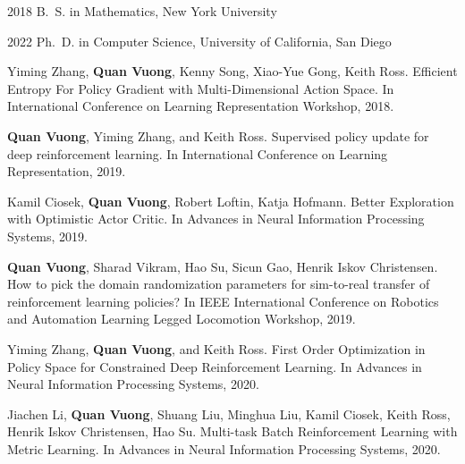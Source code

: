 \begin{frontmatter}
%
%



%
%
\begin{vitapage}
\begin{vita}
  \item[2018] B.~S. in Mathematics, New York University
  \item[2022] Ph.~D. in Computer Science, University of California, San Diego
\end{vita}
\begin{publications}
   \item Yiming Zhang, \textbf{Quan Vuong}, Kenny Song, Xiao-Yue Gong, Keith Ross. Efficient Entropy For Policy Gradient with Multi-Dimensional Action Space. In International Conference on Learning Representation Workshop, 2018.
   \item \textbf{Quan Vuong}, Yiming Zhang, and Keith Ross. Supervised policy update for deep reinforcement learning. In International Conference on Learning Representation, 2019.
   \item Kamil Ciosek, \textbf{Quan Vuong}, Robert Loftin, Katja Hofmann. Better Exploration with Optimistic Actor Critic. In Advances in Neural Information Processing Systems, 2019.
   \item \textbf{Quan Vuong}, Sharad Vikram, Hao Su, Sicun Gao, Henrik Iskov Christensen. How to pick the domain randomization parameters for sim-to-real transfer of reinforcement learning policies? In IEEE International Conference on Robotics and Automation Learning Legged Locomotion Workshop, 2019.
   \item Yiming Zhang, \textbf{Quan Vuong}, and Keith Ross. First Order Optimization in Policy Space for Constrained Deep Reinforcement Learning. In Advances in Neural Information Processing Systems, 2020.
   \item Jiachen Li, \textbf{Quan Vuong}, Shuang Liu, Minghua Liu, Kamil Ciosek, Keith Ross, Henrik Iskov Christensen, Hao Su. Multi-task Batch Reinforcement Learning with Metric Learning. In Advances in Neural Information Processing Systems, 2020.

\end{publications}
\end{vitapage}
\end{frontmatter}
